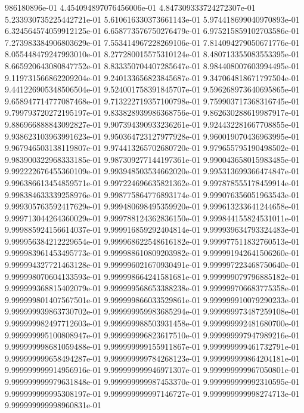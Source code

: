 986180896e-01	4.454094897076456006e-01	4.847309333724272307e-01	5.233930735225442721e-01	5.610616330373661143e-01	5.974418699040970893e-01	6.324564574059912125e-01	6.658773576750276479e-01	6.975215859102703586e-01	7.273983384906803629e-01	7.553414967228269106e-01	7.814094279050671776e-01	8.055448479247993010e-01	8.277280015575310124e-01	8.480713355083553395e-01	8.665920643080847752e-01	8.833350704407285647e-01	8.984408007603994495e-01	9.119731566862209204e-01	9.240133656823845687e-01	9.347064818671797504e-01	9.441226905348506504e-01	9.524001758391845707e-01	9.596268973640695865e-01	9.658947714777087468e-01	9.713222719357100798e-01	9.759903717368316745e-01	9.799793720272195197e-01	9.833828939986368756e-01	9.862630288619987917e-01	9.886966888843092827e-01	9.907394390933236261e-01	9.924432281667708855e-01	9.938623103963991623e-01	9.950364723127977928e-01	9.960019070436963995e-01	9.967946503138119807e-01	9.974413265702680720e-01	9.979655795190498502e-01	9.983900322968333185e-01	9.987309277144197361e-01	9.990043658015983485e-01	9.992222676455360109e-01	9.993948503534662020e-01	9.995313699366474847e-01	9.996386613454859571e-01	9.997224696635821362e-01	9.997878555178459914e-01	9.998384633339258976e-01	9.998775864776893174e-01	9.999076356051963543e-01	9.999305763592417629e-01	9.999480698495359920e-01	9.999613233641244658e-01	9.999713044264360029e-01	9.999788124362836150e-01	9.999844155824531011e-01	9.999885924156614037e-01	9.999916859292404814e-01	9.999939634793324483e-01	9.999956384212229654e-01	9.999968622548616182e-01	9.999977511832760513e-01	9.999983961453495773e-01	9.999988610809203982e-01	9.999991942641506260e-01	9.999994327721463128e-01	9.999996021670930491e-01	9.999997223468750640e-01	9.999998070604133593e-01	9.999998664241581681e-01	9.999999079796885182e-01	9.999999368815402079e-01	9.999999568653388238e-01	9.999999706683775358e-01	9.999999801407567501e-01	9.999999866033529861e-01	9.999999910079290233e-01	9.999999939863730702e-01	9.999999959983685294e-01	9.999999973487259108e-01	9.999999982497712603e-01	9.999999988503931458e-01	9.999999992481680700e-01	9.999999995100808947e-01	9.999999996823617510e-01	9.999999997947989216e-01	9.999999998681059488e-01	9.999999999155911867e-01	9.999999999461732791e-01	9.999999999658494287e-01	9.999999999784268123e-01	9.999999999864204181e-01	9.999999999914956916e-01	9.999999999946971307e-01	9.999999999967050801e-01	9.999999999979631848e-01	9.999999999987453370e-01	9.999999999992310595e-01	9.999999999995308197e-01	9.999999999997146727e-01	9.999999999998274713e-01	9.999999999998960831e-01

